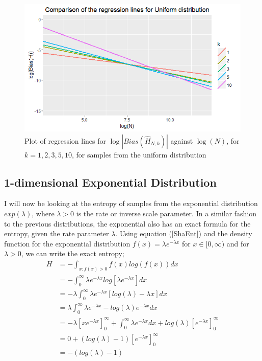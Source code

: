 \documentclass{article}
\begin{document}
\begin{figure}
  \begin{center}
    \includegraphics[width=\textwidth]{./Graphs/Uniform_comparison.png}
  \end{center}
\caption{Plot of regression lines for $\log|Bias(\hat{H}_{N, k})|$ against $\log(N)$, for $k=1, 2, 3, 5, 10$, for samples from the uniform distribution}
  \label{uniform_comparison_graph}
\end{figure}





\subsection{1-dimensional Exponential Distribution} \label{Expo_d=1}

I will now be looking at the entropy of samples from the exponential distribution $exp(\lambda)$, where $\lambda > 0$ is the rate or inverse scale parameter. In a similar fashion to the previous distributions, the exponential also has an exact formula for the entropy, given the rate parameter $\lambda$. Using equation (\ref{ShaEnt}) and the density function for the exponential distribution $f(x) = \lambda e^{-\lambda x}$ for $x \in [0, \infty)$ and for $\lambda >0$, we can write the exact entropy;
\begin{align*}
H &= - \int_{x : f(x) > 0} f(x) log(f(x)) dx \\ 
&= - \int_{0}^{\infty} \lambda e^{-\lambda x} log [ \lambda e^{-\lambda x} ] dx  \\
&= - \lambda \int_{0}^{\infty} \lambda e^{-\lambda x} [log(\lambda) - \lambda x] dx  \\
&= \lambda \int_{0}^{\infty} \lambda e^{-\lambda x} - log(\lambda) e^{-\lambda x} dx \\
&= - \lambda \left[x e^{-\lambda x}\right]_{0}^{\infty} + \int_{0}^{\infty}\lambda e^{-\lambda x} dx + log(\lambda) \left[ e^{-\lambda x}\right]_{0}^{\infty} \\
&= 0 + (log(\lambda) - 1) \left[e^{-\lambda x} \right]_{0}^{\infty} \\
&= -(log(\lambda) - 1)
\end{align*}
\end{document}
